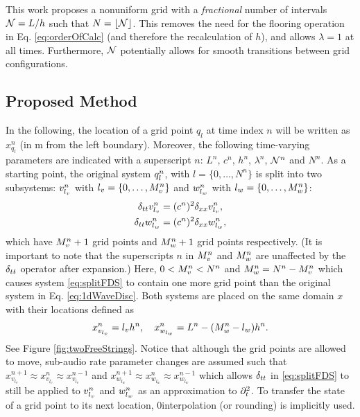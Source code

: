 \documentclass[fleqn]{jaes}
\begin{document}
This work proposes a nonuniform grid with a \textit{fractional} number of intervals $\mathcal{N} = L / h$ such that $N = \floor[\Nfrac]$. This removes the need for the flooring operation in Eq. \eqref{eq:orderOfCalc} (and therefore the recalculation of $h$), and allows $\lambda = 1$ at all times. Furthermore, $\mathcal{N}$ potentially allows for smooth transitions between grid configurations. 

\subsection{Proposed Method}
In the following, the location of a grid point $q_l$ at time index $n$ will be written as $x_{q_l}^n$ (in m from the left boundary). Moreover, the following time-varying parameters are indicated with a superscript $n$: $L^n$, $c^n$, $h^n$, $\lambda^n$, $\mathcal{N}^n$ and $N^n$. %
As a starting point, the original system $q_l^n$, with $l=\{0, \hdots, N^n\}$ is split into two subsystems: $v_{l_v}^n$ with $l_v=\{0, \hdots, M_v^n\}$ and $w_{l_w}^n$ with  $l_w=\{0, \hdots, M_w^n\}$:
\begin{subequations}\label{eq:splitFDS}
    \begin{align}
        \delta_{tt} v_{l_v}^n &= (c^n)^2\delta_{xx} v_{l_v}^n,\\
        \delta_{tt} w_{l_w}^n &= (c^n)^2\delta_{xx} w_{l_w}^n,
    \end{align}
\end{subequations}
which have $M_v^n+1$ grid points and $M_w^n+1$ grid points respectively. (It is important to note that the superscripts $n$ in $M_v^n$ and $M_w^n$ are unaffected by the $\delta_{tt}$ operator after expansion.) Here, $0<M_v^n<N^n$ and $M_w^n = N^n - M_v^n$ which causes system \eqref{eq:splitFDS} to contain one more grid point than the original system in Eq. \eqref{eq:1dWaveDisc}. Both systems are placed on the same domain $x$ with their locations defined as
\begin{equation}\label{eq:gridLocations}
    x_{v_\lv}^n =\lv h^n, \quad x_{w_\lw}^n = L^n-(\Mw-\lw)h^n.
\end{equation}
See Figure \ref{fig:twoFreeStrings}. Notice that although the grid points are allowed to move, sub-audio rate parameter changes are assumed such that $x^{n+1}_{v_{l_v}} \approx x^{n}_{v_{l_v}} \approx x^{n-1}_{v_{l_v}}$ and $x^{n+1}_{w_{l_w}} \approx x^{n}_{w_{l_w}}  \approx x^{n-1}_{w_{l_w}}$ which allows $\delta_{tt}$ in \eqref{eq:splitFDS} to still be applied to $v_{l_v}^n$ and $w_{l_w}^n$ as an approximation to $\partial_t^2$. To transfer the state of a grid point to its next location, $0$\thOrder interpolation (or rounding) is implicitly used.
\end{document}
